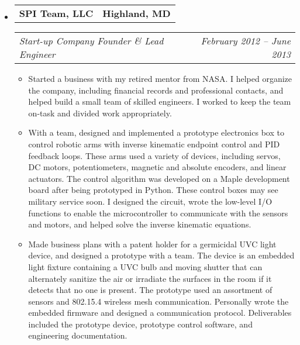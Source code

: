 \documentclass[10pt,letterpaper]{article}
\makeatletter
\newcommand{\headerrow}[2]
{\begin{tabular*}{\linewidth}{l@{\extracolsep{\fill}}r}
	#1 & #2 \\
\end{tabular*}}
\makeatother
\begin{document}
\begin{itemize}
	\item
	\headerrow
		{\textbf{SPI Team, LLC}}
		{\textbf{Highland, MD}}
	\headerrow
		{\emph{Start-up Company Founder \& Lead Engineer}}
		{\emph{February 2012 -- June 2013}}
	\begin{itemize}
        \item Started a business with my retired mentor from NASA\@.  I helped
            organize the company, including financial records and professional
            contacts, and helped build a small team of skilled engineers.  I
            worked to keep the team on-task and divided work appropriately.

        \item With a team, designed and implemented a prototype electronics box
            to control robotic arms with inverse kinematic endpoint control and
            PID feedback loops.  These arms used a variety of devices,
            including servos, DC motors, potentiometers, magnetic and absolute
            encoders, and linear actuators.  The control algorithm was
            developed on a Maple development board after being prototyped in
            Python.  These control boxes may see military service soon.  I
            designed the circuit, wrote the low-level I/O functions to enable
            the microcontroller to communicate with the sensors and motors, and
            helped solve the inverse kinematic equations.

        \item Made business plans with a patent holder for a germicidal UVC
            light device, and designed a prototype with a team. The device is
            an embedded light fixture containing a UVC bulb and moving shutter
            that can alternately sanitize the air or irradiate the surfaces in
            the room if it detects that no one is present.  The prototype used
            an assortment of sensors and 802.15.4 wireless mesh communication.
            Personally wrote the embedded firmware and designed a communication
            protocol.  Deliverables included the prototype device, prototype
            control software, and engineering documentation.



\end{itemize}
\end{itemize}
\end{document}
